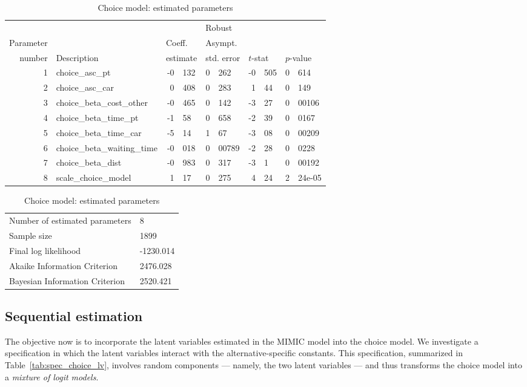 \documentclass[12pt,a4paper]{article}
\begin{document}
\begin{table}[htb]
    \footnotesize
  \begin{center}
\begin{tabular}{rlr@{.}lr@{.}lr@{.}lr@{.}l}
          &              &   \multicolumn{2}{l}{}         & \multicolumn{2}{l}{Robust}  &  \multicolumn{4}{l}{}  \\
Parameter &              &   \multicolumn{2}{l}{Coeff.}   & \multicolumn{2}{l}{Asympt.}       & \multicolumn{4}{l}{}   \\
number    &  Description &   \multicolumn{2}{l}{estimate} & \multicolumn{2}{l}{std. error}    & \multicolumn{2}{l}{$t$-stat}  &  \multicolumn{2}{l}{$p$-value} \\
\hline
1 & choice\_asc\_pt & -0&132 & 0&262 & -0&505 & 0&614 \\ 
2 & choice\_asc\_car & 0&408 & 0&283 & 1&44 & 0&149 \\ 
3 & choice\_beta\_cost\_other & -0&465 & 0&142 & -3&27 & 0&00106 \\ 
4 & choice\_beta\_time\_pt & -1&58 & 0&658 & -2&39 & 0&0167 \\ 
5 & choice\_beta\_time\_car & -5&14 & 1&67 & -3&08 & 0&00209 \\ 
6 & choice\_beta\_waiting\_time & -0&018 & 0&00789 & -2&28 & 0&0228 \\ 
7 & choice\_beta\_dist & -0&983 & 0&317 & -3&1 & 0&00192 \\
8 & scale\_choice\_model & 1&17 & 0&275 & 4&24 & 2&24e-05 \\ 
\end{tabular}
  \end{center}
\begin{tabular}{ll}
Number of estimated parameters & 8 \\
Sample size & 1899 \\
Final log likelihood & -1230.014 \\
Akaike Information Criterion & 2476.028 \\
Bayesian Information Criterion & 2520.421 \\
\end{tabular}
    \caption{Choice model: estimated parameters\label{tab:choice_params}}
\end{table}

\clearpage

\subsection{Sequential estimation}
\label{sec:sequential}
The objective now is to incorporate the latent variables estimated in
the MIMIC model into the choice model. We investigate a specification
in which the latent variables interact with the alternative-specific
constants. This specification, summarized in
Table~\vref{tab:spec_choice_lv}, involves random components --- namely,
the two latent variables --- and thus transforms the choice model into a
\emph{mixture of logit models}.
\end{document}
